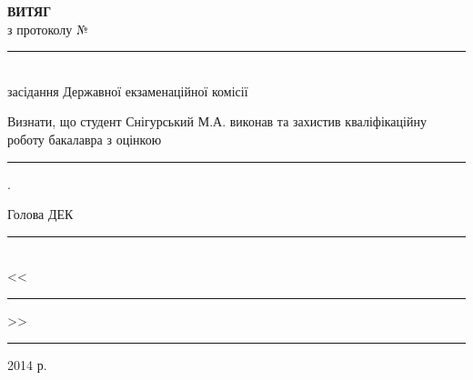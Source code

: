 \begin{titlepage}
\newcommand{\ul}[1]{\rule{#1}{0.1pt}}
\begin{spacing}{1.8}
\vspace*{4.5cm}
{\center
  {\bf ВИТЯГ}\\
  з протоколу № \ul{2.4cm}\\
  засідання Державної екзаменаційної комісії\\[2cm]}
{\noindent
  Визнати, що студент Снігурський М.А. виконав та захистив кваліфікаційну роботу бакалавра з оцінкою \hspace{1cm} \ul{7.2cm} .\\[1cm]}
{\flushright
  Голова ДЕК \ul{7.8cm}\\
  <<\ul{1cm}>> \ul{4cm} 2014 р.\\}
\end{spacing}
\end{titlepage}